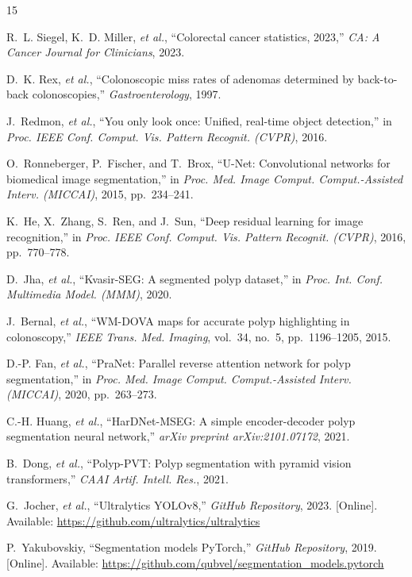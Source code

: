\documentclass[conference]{IEEEtran}
\begin{document}
\begin{thebibliography}{15}

R.~L. Siegel, K.~D. Miller, \emph{et al.}, ``Colorectal cancer statistics, 2023,'' \emph{CA: A Cancer Journal for Clinicians}, 2023.

D.~K. Rex, \emph{et al.}, ``Colonoscopic miss rates of adenomas determined by back-to-back colonoscopies,'' \emph{Gastroenterology}, 1997.

J.~Redmon, \emph{et al.}, ``You only look once: Unified, real-time object detection,'' in \emph{Proc. IEEE Conf. Comput. Vis. Pattern Recognit. (CVPR)}, 2016.

O.~Ronneberger, P.~Fischer, and T.~Brox, ``U-Net: Convolutional networks for biomedical image segmentation,'' in \emph{Proc. Med. Image Comput. Comput.-Assisted Interv. (MICCAI)}, 2015, pp.~234--241.

K.~He, X.~Zhang, S.~Ren, and J.~Sun, ``Deep residual learning for image recognition,'' in \emph{Proc. IEEE Conf. Comput. Vis. Pattern Recognit. (CVPR)}, 2016, pp.~770--778.

D.~Jha, \emph{et al.}, ``Kvasir-SEG: A segmented polyp dataset,'' in \emph{Proc. Int. Conf. Multimedia Model. (MMM)}, 2020.

J.~Bernal, \emph{et al.}, ``WM-DOVA maps for accurate polyp highlighting in colonoscopy,'' \emph{IEEE Trans. Med. Imaging}, vol.~34, no.~5, pp.~1196--1205, 2015.

D.-P. Fan, \emph{et al.}, ``PraNet: Parallel reverse attention network for polyp segmentation,'' in \emph{Proc. Med. Image Comput. Comput.-Assisted Interv. (MICCAI)}, 2020, pp.~263--273.

C.-H. Huang, \emph{et al.}, ``HarDNet-MSEG: A simple encoder-decoder polyp segmentation neural network,'' \emph{arXiv preprint arXiv:2101.07172}, 2021.

B.~Dong, \emph{et al.}, ``Polyp-PVT: Polyp segmentation with pyramid vision transformers,'' \emph{CAAI Artif. Intell. Res.}, 2021.

G.~Jocher, \emph{et al.}, ``Ultralytics YOLOv8,'' \emph{GitHub Repository}, 2023. [Online]. Available: \url{https://github.com/ultralytics/ultralytics}

P.~Yakubovskiy, ``Segmentation models PyTorch,'' \emph{GitHub Repository}, 2019. [Online]. Available: \url{https://github.com/qubvel/segmentation_models.pytorch}


\end{thebibliography}
\end{document}
